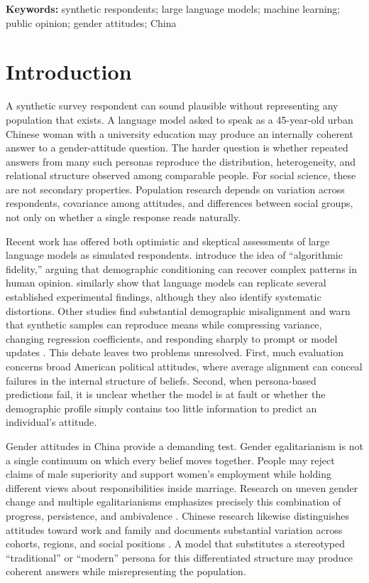 \documentclass[11pt]{article}
\begin{document}
\noindent\textbf{Keywords:} synthetic respondents; large language models; machine learning; public opinion; gender attitudes; China

\section{Introduction}

A synthetic survey respondent can sound plausible without representing any population that exists. A language model asked to speak as a 45-year-old urban Chinese woman with a university education may produce an internally coherent answer to a gender-attitude question. The harder question is whether repeated answers from many such personas reproduce the distribution, heterogeneity, and relational structure observed among comparable people. For social science, these are not secondary properties. Population research depends on variation across respondents, covariance among attitudes, and differences between social groups, not only on whether a single response reads naturally.

Recent work has offered both optimistic and skeptical assessments of large language models as simulated respondents. \citet{argyle2023one} introduce the idea of ``algorithmic fidelity,'' arguing that demographic conditioning can recover complex patterns in human opinion. \citet{aher2023simulate} similarly show that language models can replicate several established experimental findings, although they also identify systematic distortions. Other studies find substantial demographic misalignment \citep{santurkar2023opinions} and warn that synthetic samples can reproduce means while compressing variance, changing regression coefficients, and responding sharply to prompt or model updates \citep{bisbee2024synthetic}. This debate leaves two problems unresolved. First, much evaluation concerns broad American political attitudes, where average alignment can conceal failures in the internal structure of beliefs. Second, when persona-based predictions fail, it is unclear whether the model is at fault or whether the demographic profile simply contains too little information to predict an individual's attitude.

Gender attitudes in China provide a demanding test. Gender egalitarianism is not a single continuum on which every belief moves together. People may reject claims of male superiority and support women's employment while holding different views about responsibilities inside marriage. Research on uneven gender change and multiple egalitarianisms emphasizes precisely this combination of progress, persistence, and ambivalence \citep{england2010gender,knight2017egalitarianism,scarborough2019attitudes}. Chinese research likewise distinguishes attitudes toward work and family and documents substantial variation across cohorts, regions, and social positions \citep{qian2020separating,yang2023mosaic}. A model that substitutes a stereotyped ``traditional'' or ``modern'' persona for this differentiated structure may produce coherent answers while misrepresenting the population.
\end{document}
